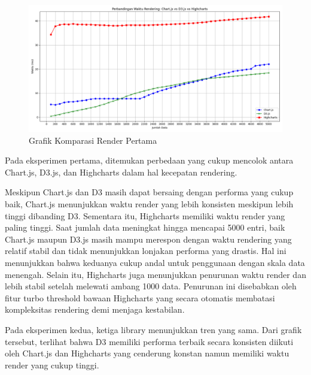 	\begin{figure}[H]
	\centering
	\includegraphics[width=0.8\linewidth]{gambar/Pembahasan/FIX_Render/Figure_1.png}
	\caption{Grafik Komparasi Render Pertama}
	\label{Grafik Komparasi Render Pertama}
\end{figure}

Pada eksperimen pertama, ditemukan perbedaan yang cukup mencolok antara Chart.js, D3.js, dan Highcharts dalam hal kecepatan rendering. 

Meskipun Chart.js dan D3 masih dapat bersaing dengan performa yang cukup baik, Chart.js menunjukkan waktu render yang lebih konsisten meskipun lebih tinggi dibanding D3. Sementara itu, Highcharts memiliki waktu render yang paling tinggi. Saat jumlah data meningkat hingga mencapai 5000 entri, baik Chart.js maupun D3.js masih mampu merespon dengan waktu rendering yang relatif stabil dan tidak menunjukkan lonjakan performa yang drastis. Hal ini menunjukkan bahwa keduanya cukup andal untuk penggunaan dengan skala data menengah. Selain itu, Highcharts juga menunjukkan penurunan waktu render dan lebih stabil setelah melewati ambang 1000 data. Penurunan ini disebabkan oleh fitur turbo threshold bawaan Highcharts yang secara otomatis membatasi kompleksitas rendering demi menjaga kestabilan. 

Pada eksperimen kedua, ketiga library menunjukkan tren yang sama. Dari grafik tersebut, terlihat bahwa D3 memiliki performa terbaik secara konsisten diikuti oleh Chart.js dan Highcharts yang cenderung konstan namun memiliki waktu render yang cukup tinggi.

